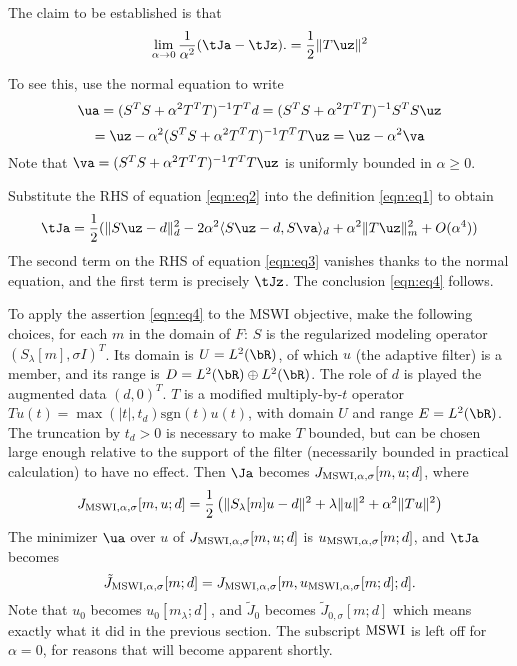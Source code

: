 The claim to be established is that
\begin{equation}
  \label{eqn:eq4}
  \lim_{\alpha \rightarrow 0} \frac{1}{\alpha^2}  (\tJa-\tJz).= \frac{1}{2}\|T\uz\|^2
\end{equation}

To see this, use the normal equation to write
\[
  \ua = (S^TS + \alpha^2 T^TT)^{-1}T^Td = (S^TS + \alpha^2 T^TT)^{-1}S^TS \uz
\]
\begin{equation}
  \label{eqn:eq2}
  = \uz - \alpha^2 (S^TS + \alpha^2 T^TT)^{-1}T^TT\uz = \uz-\alpha^2 \va
\end{equation}
Note that $\va = (S^TS + \alpha^2 T^TT)^{-1}T^TT\uz$ is uniformly bounded in $\alpha \ge 0$.

Substitute the RHS of equation \ref{eqn:eq2} into the definition \ref{eqn:eq1} to obtain
\begin{equation}
  \label{eqn:eq3}
  \tJa = \frac{1}{2}(\|S\uz-d\|_d^2 - 2 \alpha^2\langle S\uz-d, S\va\rangle_d + \alpha^2\|T\uz\|_m^2 + O(\alpha^4))
\end{equation}
The second term on the RHS of equation \ref{eqn:eq3} vanishes thanks to the normal equation, and the first term is precisely $\tJz$. The conclusion \ref{eqn:eq4} follows.

To apply the assertion \ref{eqn:eq4} to the MSWI objective, make the
following choices, for each $m$ in the domain of $F$: $S$ is the regularized
modeling operator $(S_{\lambda}[m],\sigma I)^T$.  Its domain is $U=L^2(\bR)$, of
which $u$ (the adaptive filter) is a member, and 
its range is $D = L^2(\bR) \oplus
L^2(\bR)$. The role of $d$ is played  the
augmented data $(d,0)^T$. $T$ is a modified multiply-by-$t$ operator
$Tu(t)=\max(|t|, t_d) \mbox{sgn}(t)u(t)$, with domain $U$ and
range $E=L^2(\bR)$. The truncation by $t_d > 0$ is necessary
to make $T$ bounded, but can be chosen large enough relative to the
support of the filter (necessarily bounded in practical calculation)
to have no effect. Then $\Ja$ becomes $J_{{\rm MSWI},\alpha,\sigma}[m,u;d]$, where
\begin{equation}
  \label{eqn:eq5}
   J_{{\rm MSWI},\alpha,\sigma}[m,u;d] = \frac{1}{2}\left(\|S_{\lambda}[m]u-d\|^2 +
   \lambda\|u\|^2 + \alpha^2\|Tu\|^2\right)
 \end{equation}
The minimizer $\ua$ over $u$ of $ J_{{\rm MSWI}, \alpha,\sigma}[m,u;d]$ is
$u_{{\rm MSWI},\alpha,\sigma}[m;d]$, and $\tJa$ becomes
\begin{equation}
  \label{eqn:eq6}
  \tilde{J}_{{\rm MSWI},\alpha,\sigma}[m;d] =
  J_{{\rm MSWI},\alpha,\sigma}[m,u_{{\rm MSWI},\alpha,\sigma}[m;d];d].
\end{equation}
Note that $u_0$ becomes $u_0[m_{\lambda};d]$, and $\tilde{J}_0$ becomes
$\tilde{J}_{0,\sigma}[m;d]$ which means exactly what
it did in the previous section. The subscript ${\rm MSWI}$ is left
off for $\alpha=0$, for reasons that will become apparent shortly.

